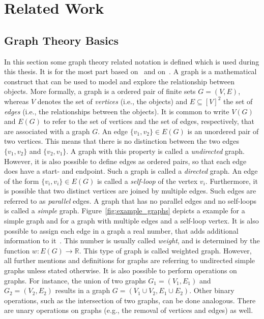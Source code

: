 \chapter{Related Work}


\section{Graph Theory Basics}
\label{sec:graph-theory-basics}

In this section some graph theory related notation is defined which is used during this thesis.
It is for the most part based on~\cite{Thulasiraman1992} and on~\cite{Diestel2012}.
A graph is a mathematical construct that can be used to model and explore the relationship between objects.
More formally, a graph is a ordered pair of finite sets \(G = (V, E)\), whereas \(V\) denotes the set of \emph{vertices} (i.e., the objects) and \(E \subseteq [V]^{2} \) the set of \emph{edges} (i.e., the relationships between the objects).
It is common to write \(V(G)\) and \(E(G)\) to refer to the set of vertices and the set of edges, respectively, that are associated with a graph \(G\).
An edge \(\{v_1, v_2\} \in E(G)\) is an unordered pair of two vertices.
This means that there is no distinction between the two edges \(\{v_1, v_2 \}\) and \(\{v_2, v_1\}\).
A graph with this property is called a \emph{undirected} graph.
However, it is also possible to define edges as ordered pairs, so that each edge does have a start- and endpoint.
Such a graph is called a \emph{directed} graph.
An edge of the form \(\{v_i, v_i\} \in E(G)\) is called a \emph{self-loop} of the vertex \(v_i\).
Furthermore, it is possible that two distinct vertices are joined by multiple edges.
Such edges are referred to as \emph{parallel} edges.
A graph that has no parallel edges and no self-loops is called a \emph{simple} graph.
Figure~\ref{fig:example_graphs} depicts a example for a simple graph and for a graph with multiple edges and a self-loop vertex.
It is also possible to assign each edge in a graph a real number, that adds additional information to it~\cite{Cormen2009}.
This number is usually called \emph{weight}, and is determined by the function \(w : E(G) \rightarrow \mathbb{R}\).
This type of graph is called weighted graph.
However, all further mentions and definitions for graphs are referring to undirected simple graphs unless stated otherwise.
It is also possible to perform operations on graphs.
For instance, the union of two graphs \(G_{1} = (V_{1}, E_{1})\) and \(G_{2} = (V_{2}, E_{2})\) results in a graph \(G = (V_{1} \cup V_{2}, E_{1} \cup E_{2})\).
Other binary operations, such as the intersection of two graphs, can be done analogous.
There are unary operations on graphs (e.g., the removal of vertices and edges) as well.

